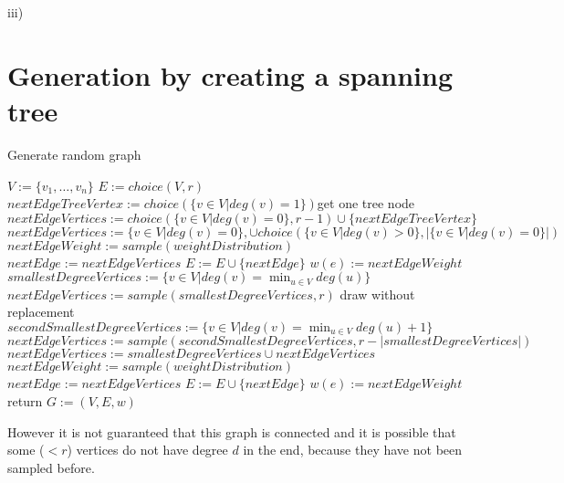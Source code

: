 iii)
\section{Generation by creating a spanning tree}

\begin{algorithm}[htpb]
	\caption{Generate random graph} 
	\begin{algorithmic}
		\State $V := \{v_1, \ldots, v_n\}$
		\State $E := choice(V,r)$
			\State $nextEdgeTreeVertex := choice(\{v\in V| deg(v) = 1 \})$\Comment get one tree node
			\State $nextEdgeVertices := choice(\{v\in V| deg(v) =0\}, r-1) \cup \{nextEdgeTreeVertex\}$
			\Else
			\State  $nextEdgeVertices :=  \{v\in V| deg(v) =0\},  \cup choice(\{v\in V| deg(v) >0\},| \{v\in V| deg(v) =0\}| ) $
			\EndIf
			\State $nextEdgeWeight := sample(weightDistribution)$ 
			\State $nextEdge := nextEdgeVertices$
			\State $E := E \cup \{nextEdge\}$
			\State $w(e):= nextEdgeWeight$
			\EndWhile
			\State $ smallestDegreeVertices := \{v\in V| deg(v) = \min_{u\in V} deg(u) \}$
			\State $nextEdgeVertices := sample(smallestDegreeVertices, r) $ \Comment draw without replacement
			\Else
			\State $secondSmallestDegreeVertices := \{v\in V| deg(v) = \min_{u\in V} deg(u) +1 \}$
			\State $nextEdgeVertices :=  sample(secondSmallestDegreeVertices, r - | smallestDegreeVertices|)$
			\State $nextEdgeVertices := smallestDegreeVertices \cup nextEdgeVertices  $
			\EndIf
			\State $nextEdgeWeight := sample(weightDistribution)$ 
			\State $nextEdge := nextEdgeVertices$
			\State $E := E \cup \{nextEdge\}$
			\State $w(e):= nextEdgeWeight$
			\EndWhile
			\State return $G:=(V,E, w)$	
			\EndFunction 
	\end{algorithmic}
\end{algorithm}	
	
However it is not guaranteed that this graph is connected and it is possible that some ($< r$) vertices do not have degree $d$ in the end, because they have not been sampled before.


